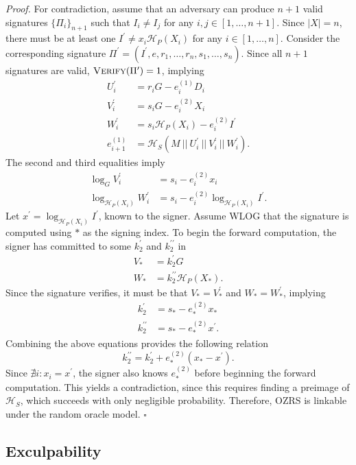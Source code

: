 \documentclass{article}
\newcommand{\algoname}[1]{\textnormal{\textsc{#1}}}
\newcommand{\verify}{\algoname{Verify}}
\newcommand{\sidx}{\ensuremath{*}}
\newcommand{\ix}{\ensuremath{x_i}}
\newcommand{\sx}{\ensuremath{x_\sidx}}
\newcommand{\ipk}{\ensuremath{X_i}}
\newcommand{\spk}{\ensuremath{X_\sidx}}
\newcommand{\hs}{\ensuremath{\mathcal{H}_S}}
\newcommand{\hp}{\ensuremath{\mathcal{H}_P}}
\newcommand{\qed}{\hfill\ensuremath{\square}}
\begin{document}
{\it Proof.} For contradiction, assume that an adversary can produce $n+1$ valid
signatures $\{\Pi_i\}_{n+1}$ such that $I_i \neq I_j$ for any $i,j \in
[1,\dots,n+1]$.  Since $|X| = n$, there must be at least one $I^\prime \neq \ix
\hp( \ipk )$ for any $i \in [1,\dots,n]$. Consider the corresponding signature
$\Pi^\prime = (I^\prime, e, r_1, \dots, r_n, s_1, \dots, s_n)$.  Since all $n+1$
signatures are valid, $\verify(\Pi^\prime)=1$, implying
\begin{align*}
  U_i^\prime &= r_i G - e_i^{(1)} D_i \\
  V_i^\prime &= s_i G - e_i^{(2)} \ipk \\
  W_i^\prime &= s_i \hp(\ipk) - e_i^{(2)} I^\prime \\
  e_{i+1}^{(1)} &= \hs( M ~ || ~ U_i^\prime ~ || ~ V_i^\prime ~ || ~ W_i^\prime).
\end{align*}
The second and third equalities imply
\begin{align*}
  \log_G V_i^\prime &= s_i - e_i^{(2)} \ix \\
  \log_{\hp(\ipk)} W_i^\prime &= s_i - e_i^{(2)} \log_{\hp(\ipk)} I^\prime.
\end{align*}
Let $x^\prime = \log_{\hp(\ipk)} I^\prime$, known to the signer.  Assume WLOG
that the signature is computed using $*$ as the signing index.  To begin the
forward computation, the signer has committed to some $k_2^\prime$ and
$k_2^{\prime\prime}$ in
\begin{align*}
  V_* &= k_2^\prime G \\
  W_* &= k_2^{\prime\prime} \hp(\spk).
\end{align*}
Since the signature verifies, it must be that $V_* = V_*^\prime$ and $W_* =
W_*^\prime$, implying
\begin{align*}
  k_2^\prime &= s_* - e_*^{(2)} \sx \\
  k_2^{\prime\prime} &= s_* - e_*^{(2)} x^\prime.
\end{align*}
Combining the above equations provides the following relation
\[
  k_2^{\prime\prime} = k_2^\prime + e_*^{(2)}(\sx - x^\prime).
\]
Since $\nexists i : x_i = x^\prime$, the signer also knows $e_*^{(2)}$ before
beginning the forward computation.  This yields a contradiction, since this
requires finding a preimage of {\hs}, which succeeds with only negligible
probability.  Therefore, OZRS is linkable under the random oracle model. \qed

\subsection{Exculpability}
\end{document}

